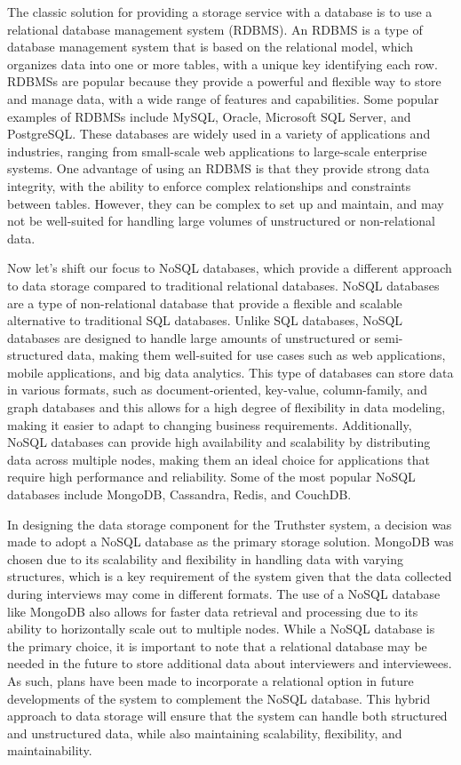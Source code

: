 \documentclass[target=mst,aauheader=]{thud}
\begin{document}
The classic solution for providing a storage service with a database is to use a relational database management system (RDBMS\cite{RDBMS}). An RDBMS is a type of database management system that is based on the relational model, which organizes data into one or more tables, with a unique key identifying each row. RDBMSs are popular because they provide a powerful and flexible way to store and manage data, with a wide range of features and capabilities. Some popular examples of RDBMSs include MySQL\cite{mySQL}, Oracle\cite{oracleDb}, Microsoft SQL Server\cite{microsoftSQL}, and PostgreSQL\cite{postgreSQL}. These databases are widely used in a variety of applications and industries, ranging from small-scale web applications to large-scale enterprise systems. One advantage of using an RDBMS is that they provide strong data integrity, with the ability to enforce complex relationships and constraints between tables. However, they can be complex to set up and maintain, and may not be well-suited for handling large volumes of unstructured or non-relational data.\par
Now let's shift our focus to NoSQL databases, which provide a different approach to data storage compared to traditional relational databases. NoSQL databases are a type of non-relational database that provide a flexible and scalable alternative to traditional SQL databases. Unlike SQL databases, NoSQL databases are designed to handle large amounts of unstructured or semi-structured data, making them well-suited for use cases such as web applications, mobile applications, and big data analytics. This type of databases can store data in various formats, such as document-oriented, key-value, column-family, and graph databases and this allows for a high degree of flexibility in data modeling, making it easier to adapt to changing business requirements. Additionally, NoSQL databases can provide high availability and scalability by distributing data across multiple nodes, making them an ideal choice for applications that require high performance and reliability. Some of the most popular NoSQL databases include MongoDB\cite{mongoDB}, Cassandra\cite{cassandra}, Redis\cite{redis}, and CouchDB\cite{apacheCouch}.\par
In designing the data storage component for the Truthster system, a decision was made to adopt a NoSQL database as the primary storage solution. MongoDB was chosen due to its scalability and flexibility in handling data with varying structures, which is a key requirement of the system given that the data collected during interviews may come in different formats. The use of a NoSQL database like MongoDB also allows for faster data retrieval and processing due to its ability to horizontally scale out to multiple nodes. While a NoSQL database is the primary choice, it is important to note that a relational database may be needed in the future to store additional data about interviewers and interviewees. As such, plans have been made to incorporate a relational option in future developments of the system to complement the NoSQL database. This hybrid approach to data storage will ensure that the system can handle both structured and unstructured data, while also maintaining scalability, flexibility, and maintainability.
\end{document}
